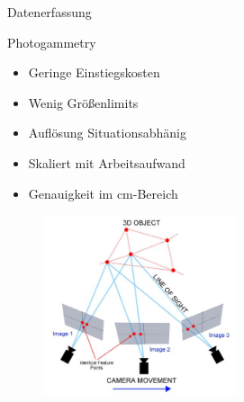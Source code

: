 \documentclass[../slides.tex]{subfiles}
\begin{document}
\begin{frame}{Datenerfassung}
  
\begin{minipage}[t]{.3\textwidth}
    \begin{block}{Photogammetry}
        \begin{itemize}
            \item Geringe Einstiegskosten
            \item Wenig Größenlimits
            \item Auflösung Situationsabhänig
            \item Skaliert mit Arbeitsaufwand
            \item Genauigkeit im cm-Bereich
        \end{itemize}
    \end{block}
    \end{minipage}
    \hfill
    \begin{minipage}[t]{.69\textwidth}
    \begin{figure}[]
        \includegraphics[height=150pt]{img_niklas/photogrammetry.jpg}
        \caption{}
        \label{fig:photogrammetry}
    \end{figure}
    \end{minipage}
    
\end{frame}
\end{document}
